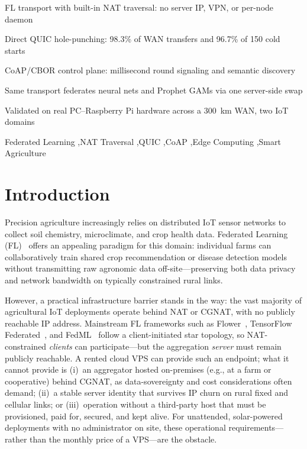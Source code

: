 \documentclass[a4paper,fleqn]{cas-dc}
\begin{document}
\begin{highlights}
\item FL transport with built-in NAT traversal: no server IP, VPN, or per-node daemon
\item Direct QUIC hole-punching: 98.3\% of WAN transfers and 96.7\% of 150 cold starts
\item CoAP/CBOR control plane: millisecond round signaling and semantic discovery
\item Same transport federates neural nets and Prophet GAMs via one server-side swap
\item Validated on real PC--Raspberry Pi hardware across a 300~km WAN, two IoT domains
\end{highlights}

\begin{keywords}
Federated Learning \sep NAT Traversal \sep QUIC \sep CoAP \sep Edge Computing \sep Smart Agriculture
\end{keywords}

\maketitle

\section{Introduction}
\label{sec:introduction}

Precision agriculture increasingly relies on distributed IoT sensor networks to collect soil chemistry, microclimate, and crop health data. Federated Learning (FL)~\cite{mcmahan2017} offers an appealing paradigm for this domain: individual farms can collaboratively train shared crop recommendation or disease detection models without transmitting raw agronomic data off-site---preserving both data privacy and network bandwidth on typically constrained rural links.

However, a practical infrastructure barrier stands in the way: the vast majority of agricultural IoT deployments operate behind NAT or CGNAT, with no publicly reachable IP address. Mainstream FL frameworks such as Flower~\cite{flower2022}, TensorFlow Federated~\cite{tff2019}, and FedML~\cite{fedml2020} follow a client-initiated star topology, so NAT-constrained \emph{clients} can participate---but the aggregation \emph{server} must remain publicly reachable. A rented cloud VPS can provide such an endpoint; what it cannot provide is (i)~an aggregator hosted on-premises (e.g., at a farm or cooperative) behind CGNAT, as data-sovereignty and cost considerations often demand; (ii)~a stable server identity that survives IP churn on rural fixed and cellular links; or (iii)~operation without a third-party host that must be provisioned, paid for, secured, and kept alive. For unattended, solar-powered deployments with no administrator on site, these operational requirements---rather than the monthly price of a VPS---are the obstacle.
\end{document}
